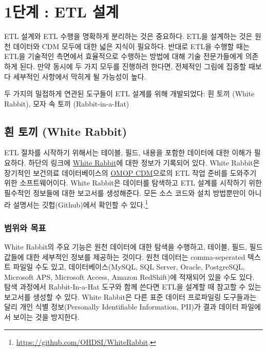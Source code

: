 \documentclass[11pt]{book}
\let\rmarkdownfootnote\footnote%
\def\footnote{\protect\rmarkdownfootnote}
\theoremstyle{definition}
\theoremstyle{definition}
\theoremstyle{definition}
\theoremstyle{remark}
\begin{document}
\section{1단계 : ETL 설계}\label{-etl-}

ETL 설계와 ETL 수행을 명확하게 분리하는 것은 중요하다. ETL을 설계하는
것은 원천 데이터와 CDM 모두에 대한 넓은 지식이 필요하다. 반대로 ETL을
수행할 때는 ETL을 기술적인 측면에서 효율적으로 수행하는 방법에 대해 기술
전문가들에게 의존하게 된다. 만약 동시에 두 가지 모두를 진행하려 한다면,
전체적인 그림에 집중할 때보다 세부적인 사항에서 막히게 될 가능성이 높다.

두 가지의 밀접하게 연관된 도구들이 ETL 설계를 위해 개발되었다: 흰 토끼
(White Rabbit), 모자 속 토끼 (Rabbit-in-a-Hat)

\subsection{흰 토끼 (White Rabbit)}\label{--white-rabbit}

ETL 절차를 시작하기 위해서는 테이블, 필드, 내용을 포함한 데이터에 대한
이해가 필요하다. 하단의 링크에
\href{https://github.com/OHDSI/WhiteRabbit}{White Rabbit}에 대한 정보가
기록되어 있다. White Rabbit은 장기적인 보건의료 데이터베이스의
\href{https://github.com/OHDSI/CommonDataModel}{OMOP CDM}으로의 ETL 작업
준비를 도와주기 위한 소프트웨어이다. White Rabbit은 데이터를 탐색하고
ETL 설계를 시작하기 위한 필수적인 정보들에 대한 보고서를 생성해준다.
모든 소스 코드와 설치 방법뿐만이 아니라 설명서는 깃헙(Github)에서 확인할
수 있다.\footnote{\url{https://github.com/OHDSI/WhiteRabbit}.}
 

\subsubsection*{범위와 목표}\label{-}

White Rabbit의 주요 기능은 원천 데이터에 대한 탐색을 수행하고, 테이블,
필드, 필드 값들에 대한 세부적인 정보를 제공하는 것이다. 원천 데이터는
comma-seperated 텍스트 파일일 수도 있고, 데이터베이스(MySQL, SQL Server,
Oracle, PostgreSQL, Microsoft APS, Microsoft Access, Amazon RedShift)에
적재되어 있을 수도 있다. 탐색 과정에서 Rabbit-In-a-Hat 도구와 함께
쓴다면 ETL을 설계할 때 참고할 수 있는 보고서를 생성할 수 있다. White
Rabbit은 다른 표준 데이터 프로파일링 도구들과는 달리 개인 식별
정보(Personally Identifiable Information, PII)가 결과 데이터 파일에서
보이는 것을 방지한다.
\end{document}
